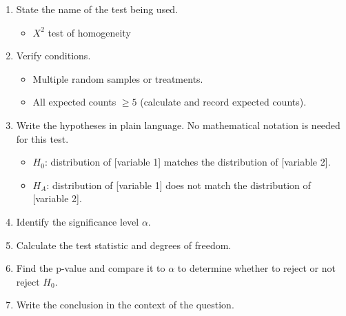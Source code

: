 \begin{termBox}{
\begin{enumerate}
\setlength{\itemsep}{0mm}
\item State the name of the test being used.
\begin{itemize}
\setlength{\itemsep}{0mm}
\item $X^2$ test of homogeneity
\end{itemize}
\item Verify conditions.
\begin{itemize}
\setlength{\itemsep}{0mm}
\item Multiple random samples or treatments.
\item All expected counts $\ge 5$ (calculate and record expected counts).
\end{itemize}
\item Write the hypotheses in plain language. No mathematical notation is needed for this test.\vspace{-2mm}
\begin{itemize}
\item $H_0$: distribution of [variable 1] matches the distribution of [variable 2].
\item $H_A$: distribution of [variable 1] does not match the distribution of [variable 2].
\end{itemize}
\item Identify the significance level $\alpha$.
\item Calculate the test statistic and degrees of freedom.%
\item Find the p-value and compare it to $\alpha$ to determine whether to reject or not reject $H_0$.
\item Write the conclusion in the context of the question.
\end{enumerate}}
\end{termBox}

\textA{\newpage}

